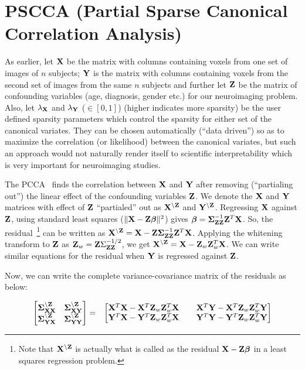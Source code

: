 \documentclass{llncs}
\newcommand{\X}{{\bf X}}
\newcommand{\Y}{{\bf Y}}
\newcommand{\Z}{{\bf Z}}
\newcommand{\bs}{\boldsymbol}
\begin{document}
\section{PSCCA (Partial Sparse Canonical Correlation Analysis)}
As earlier, let $\X$ be the matrix with columns containing voxels from one set of
images of $n$ subjects; $\Y$ is the matrix with columns containing voxels from the second
set of images from the same $n$ subjects and further let $\Z$ be the matrix of confounding variables (age, diagnosis, gender etc.) for our neuroimaging problem. Also, let $\lambda_{\X}$ and $\lambda_{\Y}$ ($\in [0,1]$) (higher indicates more sparsity) be the user defined sparsity parameters which control the sparsity for either set of the canonical variates. They can be chosen automatically (``data driven'') so as to maximize the correlation (or likelihood) between the canonical variates, but such an approach would not naturally render itself  to scientific interpretability which is very important for neuroimaging studies. 

The PCCA~\cite{timm} finds the correlation between $\X$ and $\Y$ after removing (``partialing out'') the linear effect of the confounding variables $\Z$. 
We denote the $\X$ and $\Y$ matrices with effect of $\Z$ ``partialed'' out as $\X^{\backslash\Z}$ and $\Y^{\backslash\Z}$. Regressing $\X$ against $\Z$, using standard least squares ($\|\X -\Z\bs\beta\|^2$) gives $\bs\beta=  \bs\Sigma_{\Z\Z}^{-1}\Z^T\X$. So, the residual~\footnote{Note that $\X^{\backslash\Z}$ is actually what is called as the residual $\X-\Z\bs\beta$ in a least squares regression problem.} can be written as  $\X^{\backslash\Z}=\X - \Z\bs\Sigma_{\Z\Z}^{-1}\Z^T\X$. Applying the whitening transform to $\Z$  as $\Z_w =\Z \Sigma_{\Z\Z}^{-1/2}$, we get $\X^{\backslash\Z}=\X - \Z_w\Z_w^T\X$.
We can write similar equations for the residual when $\Y$ is regressed against $\Z$.
 
Now, we can write the complete variance-covariance matrix of the residuals as below:

\begin{eqnarray}
\label{matrices}
\begin{bmatrix}
  \bs\Sigma_{\X\X}^{\backslash \Z} & \bs\Sigma_{\X\Y}^{\backslash \Z} \\
  \bs\Sigma_{\Y\X}^{\backslash \Z} & \bs\Sigma_{\Y\Y}^{\backslash \Z} 
\end{bmatrix}
&=&
\begin{bmatrix}
  \X^T\X -\X^T \Z_w\Z_w^T\X &\;\;\;\;   \X^T\Y -\X^T \Z_w\Z_w^T\Y\\
  \Y^T\X -\Y^T \Z_w\Z_w^T\X &\;\;\;\;   \Y^T\Y -\Y^T \Z_w\Z_w^T\Y
\end{bmatrix}
\end{eqnarray}
\end{document}
